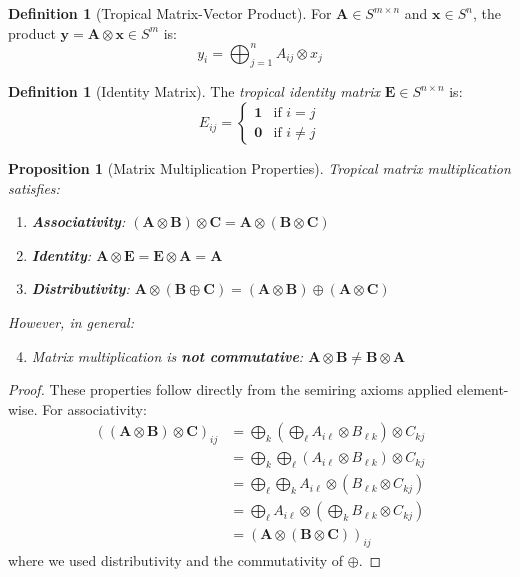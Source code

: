 \documentclass[11pt,a4paper]{article}
\theoremstyle{plain}
\newtheorem{proposition}[theorem]{Proposition}
\theoremstyle{definition}
\newtheorem{definition}[theorem]{Definition}
\newcommand{\mat}[1]{\mathbf{#1}}
\newcommand{\vect}[1]{\mathbf{#1}}
\begin{document}
\begin{definition}[Tropical Matrix-Vector Product]
For $\mat{A} \in S^{m \times n}$ and $\vect{x} \in S^n$, the product $\vect{y} = \mat{A} \otimes \vect{x} \in S^m$ is:
\begin{equation}
    y_i = \bigoplus_{j=1}^{n} A_{ij} \otimes x_j
\end{equation}
\end{definition}

\begin{definition}[Identity Matrix]
The \emph{tropical identity matrix} $\mat{E} \in S^{n \times n}$ is:
\begin{equation}
    E_{ij} = \begin{cases}
        \mathbf{1} & \text{if } i = j \\
        \mathbf{0} & \text{if } i \neq j
    \end{cases}
\end{equation}
\end{definition}

\begin{proposition}[Matrix Multiplication Properties]
\label{prop:matrix-mult}
Tropical matrix multiplication satisfies:
\begin{enumerate}[label=(\roman*)]
    \item \textbf{Associativity}: $(\mat{A} \otimes \mat{B}) \otimes \mat{C} = \mat{A} \otimes (\mat{B} \otimes \mat{C})$
    \item \textbf{Identity}: $\mat{A} \otimes \mat{E} = \mat{E} \otimes \mat{A} = \mat{A}$
    \item \textbf{Distributivity}: $\mat{A} \otimes (\mat{B} \oplus \mat{C}) = (\mat{A} \otimes \mat{B}) \oplus (\mat{A} \otimes \mat{C})$
\end{enumerate}
However, in general:
\begin{enumerate}[label=(\roman*)]
    \setcounter{enumi}{3}
    \item Matrix multiplication is \textbf{not commutative}: $\mat{A} \otimes \mat{B} \neq \mat{B} \otimes \mat{A}$
\end{enumerate}
\end{proposition}

\begin{proof}
These properties follow directly from the semiring axioms applied element-wise. For associativity:
\begin{align*}
    ((\mat{A} \otimes \mat{B}) \otimes \mat{C})_{ij} &= \bigoplus_k \left(\bigoplus_\ell A_{i\ell} \otimes B_{\ell k}\right) \otimes C_{kj} \\
    &= \bigoplus_k \bigoplus_\ell (A_{i\ell} \otimes B_{\ell k}) \otimes C_{kj} \\
    &= \bigoplus_\ell \bigoplus_k A_{i\ell} \otimes (B_{\ell k} \otimes C_{kj}) \\
    &= \bigoplus_\ell A_{i\ell} \otimes \left(\bigoplus_k B_{\ell k} \otimes C_{kj}\right) \\
    &= (\mat{A} \otimes (\mat{B} \otimes \mat{C}))_{ij}
\end{align*}
where we used distributivity and the commutativity of $\oplus$.
\end{proof}
\end{document}
